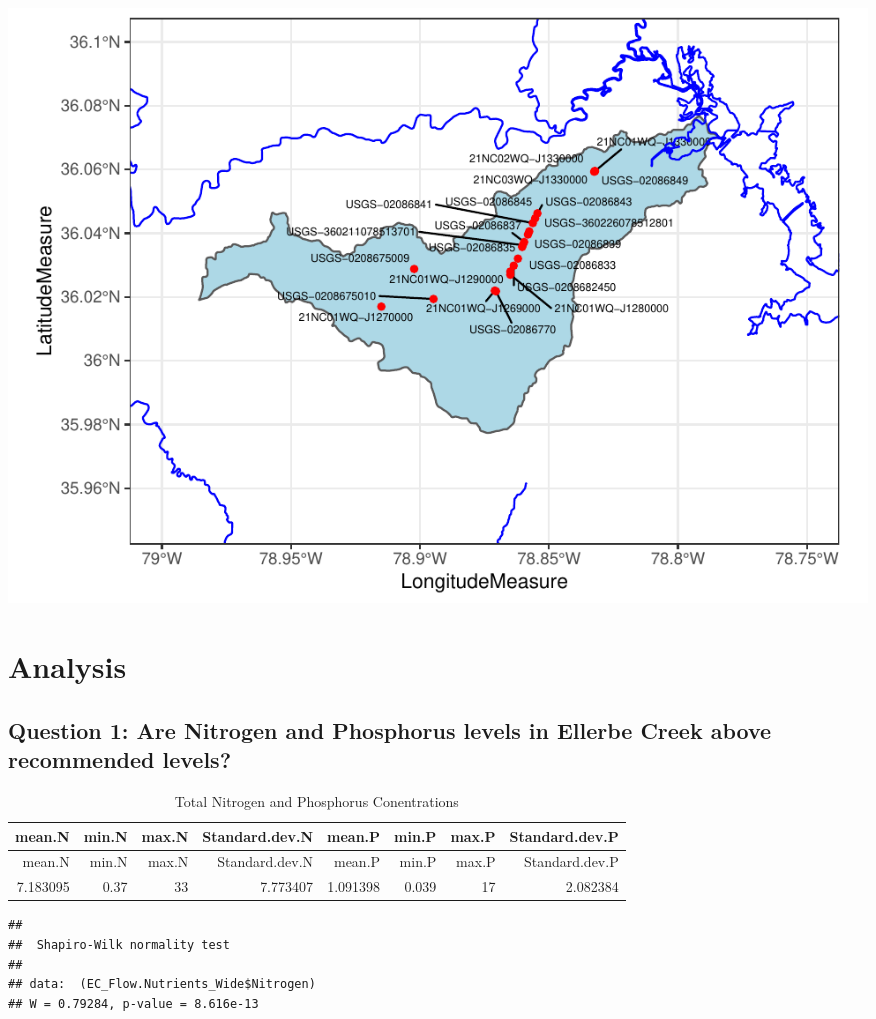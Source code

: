 \documentclass[12pt,]{article}
\begin{document}
\includegraphics{Landman_ENV872_Project_files/figure-latex/unnamed-chunk-6-1.pdf}

\newpage

\hypertarget{analysis}{%
\section{Analysis}\label{analysis}}

\hypertarget{question-1-are-nitrogen-and-phosphorus-levels-in-ellerbe-creek-above-recommended-levels}{%
\subsection{Question 1: Are Nitrogen and Phosphorus levels in Ellerbe
Creek above recommended
levels?}\label{question-1-are-nitrogen-and-phosphorus-levels-in-ellerbe-creek-above-recommended-levels}}

\begin{longtable}[]{@{}rrrrrrrr@{}}
\caption{Total Nitrogen and Phosphorus Conentrations}\tabularnewline
\toprule
mean.N & min.N & max.N & Standard.dev.N & mean.P & min.P & max.P &
Standard.dev.P\tabularnewline
\midrule
\endfirsthead
\toprule
mean.N & min.N & max.N & Standard.dev.N & mean.P & min.P & max.P &
Standard.dev.P\tabularnewline
\midrule
\endhead
7.183095 & 0.37 & 33 & 7.773407 & 1.091398 & 0.039 & 17 &
2.082384\tabularnewline
\bottomrule
\end{longtable}

\begin{verbatim}
## 
##  Shapiro-Wilk normality test
## 
## data:  (EC_Flow.Nutrients_Wide$Nitrogen)
## W = 0.79284, p-value = 8.616e-13
\end{verbatim}
\end{document}
